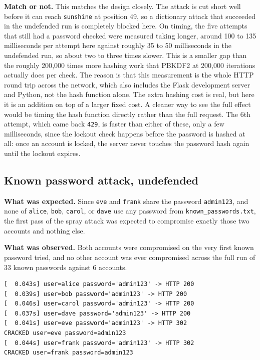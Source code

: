 \documentclass[11pt]{article}
\begin{document}
\textbf{Match or not.} This matches the design closely. The attack is cut
short well before it can reach \texttt{sunshine} at position 49, so a
dictionary attack that succeeded in the undefended run is completely
blocked here. On timing, the five attempts that still had a password
checked were measured taking longer, around 100 to 135 milliseconds per
attempt here against roughly 35 to 50 milliseconds in the undefended run,
so about two to three times slower. This is a smaller gap than the
roughly 200{,}000 times more hashing work that PBKDF2 at 200{,}000
iterations actually does per check. The reason is that this measurement is
the whole HTTP round trip across the network, which also includes the
Flask development server and Python, not the hash function alone. The
extra hashing cost is real, but here it is an addition on top of a larger
fixed cost. A cleaner way to see the full effect would be timing the hash
function directly rather than the full request. The 6th attempt, which
came back \texttt{429}, is faster than either of these, only a few
milliseconds, since the lockout check happens before the password is
hashed at all: once an account is locked, the server never touches the
password hash again until the lockout expires.

\subsection{Known password attack, undefended}

\textbf{What was expected.} Since \texttt{eve} and \texttt{frank} share the
password \texttt{admin123}, and none of \texttt{alice}, \texttt{bob},
\texttt{carol}, or \texttt{dave} use any password from
\texttt{known\_passwords.txt}, the first pass of the spray attack was
expected to compromise exactly those two accounts and nothing else.

\textbf{What was observed.} Both accounts were compromised on the very first
known password tried, and no other account was ever compromised across the
full run of 33 known passwords against 6 accounts.

\begin{lstlisting}
[  0.043s] user=alice password='admin123' -> HTTP 200
[  0.039s] user=bob password='admin123' -> HTTP 200
[  0.046s] user=carol password='admin123' -> HTTP 200
[  0.037s] user=dave password='admin123' -> HTTP 200
[  0.041s] user=eve password='admin123' -> HTTP 302
CRACKED user=eve password=admin123
[  0.044s] user=frank password='admin123' -> HTTP 302
CRACKED user=frank password=admin123
\end{lstlisting}
\end{document}
